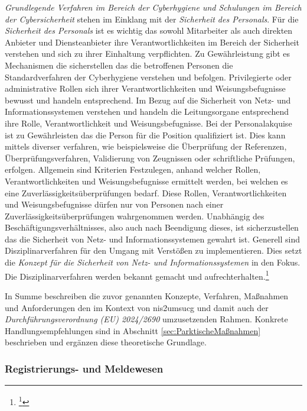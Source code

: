 \documentclass[11pt,a4paper,hidelinks]{article}   %
\begin{document}
                \emph{Grundlegende Verfahren im Bereich der Cyberhygiene und Schulungen im Bereich der Cybersicherheit} stehen im Einklang mit der \emph{Sicherheit des Personals}. Für die \emph{Sicherheit des Personals} ist es wichtig das sowohl Mitarbeiter als auch direkten Anbieter und Diensteanbieter ihre Verantwortlichkeiten im Bereich der Sicherheit verstehen und sich zu ihrer Einhaltung verpflichten. Zu Gewährleistung gibt es Mechanismen die sicherstellen das die betroffenen Personen die Standardverfahren der Cyberhygiene verstehen und befolgen. Privilegierte oder administrative Rollen sich ihrer Verantwortlichkeiten und Weisungsbefugnisse bewusst und handeln entsprechend. Im Bezug auf die Sicherheit von Netz- und Informationssystemen verstehen und handeln die Leitungsorgane entsprechend ihre Rolle, Verantwortlichkeit und Weisungsbefugnisse. Bei der Personalakquise ist zu Gewährleisten das die Person für die Position qualifiziert ist. Dies kann mittels diverser verfahren, wie beispielsweise die Überprüfung der   Referenzen, Überprüfungsverfahren, Validierung von Zeugnissen oder schriftliche Prüfungen, erfolgen. Allgemein sind Kriterien Festzulegen, anhand welcher Rollen, Verantwortlichkeiten und Weisungsbefugnisse ermittelt werden, bei welchen es eine Zuverlässigkeitsüberprüfungen bedarf. Diese Rollen, Verantwortlichkeiten und Weisungsbefugnisse dürfen nur von Personen nach einer Zuverlässigkeitsüberprüfungen wahrgenommen werden. Unabhängig des Beschäftigungsverhältnisses, also auch nach Beendigung dieses, ist sicherzustellen das die Sicherheit von Netz- und Informationssystemen gewahrt ist. Generell sind Disziplinarverfahren für den Umgang mit Verstößen zu implementieren. Dies setzt die \emph{Konzept für die Sicherheit von Netz- und Informationssystemen} in den Fokus. Die Disziplinarverfahren werden bekannt gemacht und aufrechterhalten.\footnote{
                    \footcite[Vgl. Anhang, Nummer 8][]{EU2024-2690}
                }\medbreak

                In Summe beschreiben die zuvor genannten Konzepte, Verfahren, Maßnahmen und Anforderungen den im Kontext von \gls{nis2umsucg} und damit auch der \emph{Durchführungsverordnung (EU) 2024/2690} umzusetzenden Rahmen. Konkrete Handlungsempfehlungen sind in Abschnitt \ref{sec:ParktischeMaßnahmen} beschrieben und ergänzen diese theoretische Grundlage.
            \subsubsection{Registrierungs- und Meldewesen}
\end{document}
